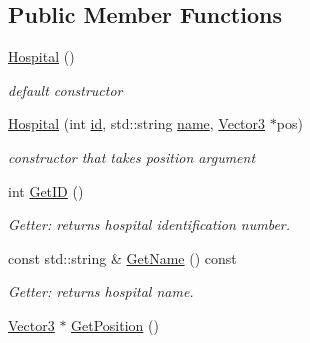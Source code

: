 \subsection*{Public Member Functions}
\begin{DoxyCompactItemize}
\item 
\mbox{\label{classHospital_a130b3a6c6e3dd35443437e1f5144b1ac}} 
\hyperlink{classHospital_a130b3a6c6e3dd35443437e1f5144b1ac}{Hospital} ()
\begin{DoxyCompactList}\small\item\em default constructor \end{DoxyCompactList}\item 
\mbox{\label{classHospital_a04ebe37898559edc3c5bcabe7679366e}} 
\hyperlink{classHospital_a04ebe37898559edc3c5bcabe7679366e}{Hospital} (int \hyperlink{classHospital_ad04682106dbb95ac699a4fc90436db0e}{id}, std\+::string \hyperlink{classHospital_a26fa9b5e5ae30cc8db885c84e02fc2de}{name}, \hyperlink{classVector3}{Vector3} $\ast$pos)
\begin{DoxyCompactList}\small\item\em constructor that takes position argument \end{DoxyCompactList}\item 
\mbox{\label{classHospital_a4bb23b897139dd9881654e3a95ae530a}} 
int \hyperlink{classHospital_a4bb23b897139dd9881654e3a95ae530a}{Get\+ID} ()
\begin{DoxyCompactList}\small\item\em Getter\+: returns hospital identification number. \end{DoxyCompactList}\item 
\mbox{\label{classHospital_adcbc021db62d8ffb8566f73e79da46a7}} 
const std\+::string \& \hyperlink{classHospital_adcbc021db62d8ffb8566f73e79da46a7}{Get\+Name} () const
\begin{DoxyCompactList}\small\item\em Getter\+: returns hospital name. \end{DoxyCompactList}\item 
\mbox{\label{classHospital_a9da27fc31c98792e720fe34044cac3f0}} 
\hyperlink{classVector3}{Vector3} $\ast$ \hyperlink{classHospital_a9da27fc31c98792e720fe34044cac3f0}{Get\+Position} ()

\end{DoxyCompactItemize}
